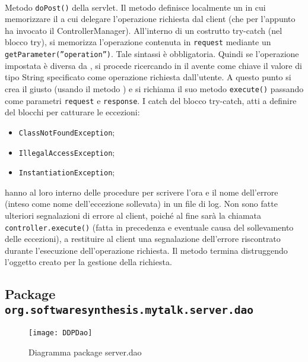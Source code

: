 \begin{description}
	\item{}\\
	Metodo \texttt{doPost()} della servlet. Il metodo definisce localmente un  in cui memorizzare il  a cui delegare l'operazione richiesta dal client (che per l'appunto ha invocato il ControllerManager). All'interno di un costrutto try-catch (nel blocco try), si memorizza l'operazione contenuta in \texttt{request} mediante un \texttt{getParameter(''operation'')}. Tale sintassi è obbligatoria. Quindi se l'operazione impostata è diversa da , si procede ricercando in  il  avente come chiave il valore di tipo String specificato come operazione richiesta dall'utente. A questo punto si crea il  giusto (usando il metodo ) e si richiama il suo metodo \texttt{execute()} passando come parametri \texttt{request} e \texttt{response}. I catch del blocco try-catch, atti a definire del blocchi per catturare le eccezioni: 
	\begin{itemize}
		\item \texttt{ClassNotFoundException};
		\item \texttt{IllegalAccessException};
		\item \texttt{InstantiationException};
	\end{itemize}
	
	hanno al loro interno delle procedure per scrivere l'ora e il nome dell'errore (inteso come nome dell'eccezione sollevata) in un file di log. Non sono fatte ulteriori segnalazioni di errore al client, poiché al fine sarà la chiamata \texttt{controller.execute()} (fatta in precedenza e eventuale causa del sollevamento delle eccezioni), a restituire al client una segnalazione dell'errore riscontrato durante l'esecuzione dell'operazione richiesta. Il metodo termina distruggendo l'oggetto  creato per la gestione della richiesta.
	
\end{description}

\subsection{Package \texttt{org.softwaresynthesis.mytalk.server.dao}}\label{sec:dao}

\begin{figure}[H]
  \texttt{[image: DDPDao]}
\caption{Diagramma package server.dao}
\end{figure}


